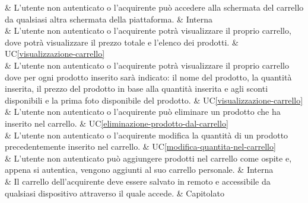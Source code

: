  & L'utente non autenticato o l'acquirente può accedere alla schermata del carrello da qualsiasi altra schermata della piattaforma. & Interna \\

 & L'utente non autenticato o l'acquirente potrà visualizzare il proprio carrello, dove potrà visualizzare il prezzo totale e l'elenco dei prodotti. & UC\ref{visualizzazione-carrello} \\

 & L'utente non autenticato o l'acquirente potrà visualizzare il proprio carrello dove per ogni prodotto inserito sarà indicato: il nome del prodotto, la quantità inserita, il prezzo del prodotto in base alla quantità inserita e agli sconti disponibili e la prima foto disponibile del prodotto. & UC\ref{visualizzazione-carrello} \\

 & L'utente non autenticato o l'acquirente può eliminare un prodotto che ha inserito nel carrello. & UC\ref{eliminazione-prodotto-dal-carrello} \\

 & L'utente non autenticato o l'acquirente modifica la quantità di un prodotto precedentemente inserito nel carrello. & UC\ref{modifica-quantita-nel-carrello} \\

 & L'utente non autenticato può aggiungere prodotti nel carrello come ospite e, appena si autentica, vengono aggiunti al suo carrello personale. & Interna \\

 & Il carrello dell'acquirente deve essere salvato in remoto e accessibile da qualsiasi dispositivo attraverso il quale accede. & Capitolato \\

